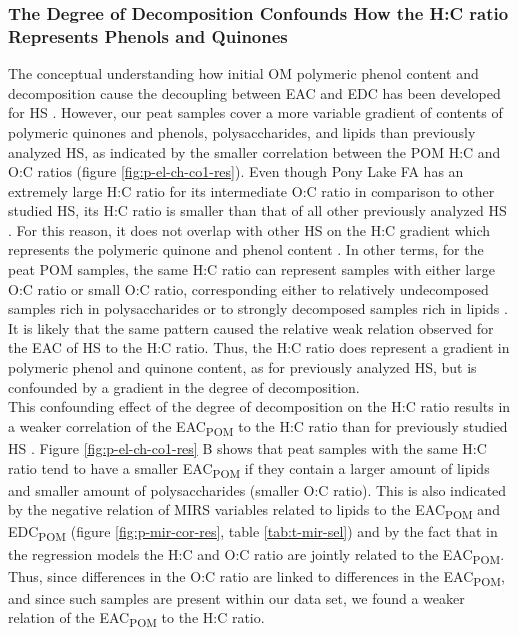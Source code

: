 \documentclass[alpha-refs, lineno]{wiley-article-rmd}
\begin{document}
\hypertarget{the-degree-of-decomposition-confounds-how-the-hc-ratio-represents-phenols-and-quinones}{%
\subsubsection{The Degree of Decomposition Confounds How the H:C ratio Represents Phenols and Quinones}\label{the-degree-of-decomposition-confounds-how-the-hc-ratio-represents-phenols-and-quinones}}

The conceptual understanding how initial OM polymeric phenol content and decomposition cause the decoupling between EAC and EDC has been developed for HS \autocite{Aeschbacher.2012}. However, our peat samples cover a more variable gradient of contents of polymeric quinones and phenols, polysaccharides, and lipids than previously analyzed HS, as indicated by the smaller correlation between the POM H:C and O:C ratios (figure \ref{fig:p-el-ch-co1-res}). Even though Pony Lake FA has an extremely large H:C ratio for its intermediate O:C ratio in comparison to other studied HS, its H:C ratio is smaller than that of all other previously analyzed HS \autocite{Aeschbacher.2012,HuffmanLaboratories.NA}. For this reason, it does not overlap with other HS on the H:C gradient which represents the polymeric quinone and phenol content \autocite{Aeschbacher.2010}. In other terms, for the peat POM samples, the same H:C ratio can represent samples with either large O:C ratio or small O:C ratio, corresponding either to relatively undecomposed samples rich in polysaccharides or to strongly decomposed samples rich in lipids \autocite{Kim.2003,Leifeld.2012,Bader.2018}. It is likely that the same pattern caused the relative weak relation \textcite{Tan.2017} observed for the EAC of HS to the H:C ratio. Thus, the H:C ratio does represent a gradient in polymeric phenol and quinone content, as for previously analyzed HS, but is confounded by a gradient in the degree of decomposition.\\
This confounding effect of the degree of decomposition on the H:C ratio results in a weaker correlation of the EAC\textsubscript{POM} to the H:C ratio than for previously studied HS \autocite{Aeschbacher.2010}. Figure \ref{fig:p-el-ch-co1-res} B shows that peat samples with the same H:C ratio tend to have a smaller EAC\textsubscript{POM} if they contain a larger amount of lipids and smaller amount of polysaccharides (smaller O:C ratio). This is also indicated by the negative relation of MIRS variables related to lipids to the EAC\textsubscript{POM} and EDC\textsubscript{POM} (figure \ref{fig:p-mir-cor-res}, table \ref{tab:t-mir-sel}) and by the fact that in the regression models the H:C and O:C ratio are jointly related to the EAC\textsubscript{POM}. Thus, since differences in the O:C ratio are linked to differences in the EAC\textsubscript{POM}, and since such samples are present within our data set, we found a weaker relation of the EAC\textsubscript{POM} to the H:C ratio.
\end{document}
